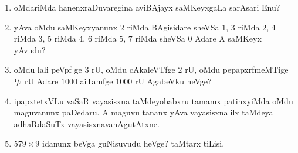 \begin{enumerate}
\item oMdariMda hanenxraDuvaregina aviBAjayx saMKeyxgaLa sarAsari Enu?

\item yAva oMdu saMKeyxyanunx $2$ riMda BAgisidare sheVSa $1$, $3$ riMda $2$, $4$ riMda $3$, $5$ riMda $4$, $6$ riMda $5$, $7$ riMda sheVSa $0$ Adare A saMKeyx yAvudu?

\item oMdu lali peVpf ge $3$ rU, oMdu cAkaleVTfge $2$ rU, oMdu pepapxrfmeMTige $\sfrac{1}{2}$ rU Adare $1000$ aiTamfge $1000$ rU AgabeVku heVge?

\item ipapxtetxVLu vaSaR vayasisxna taMdeyobabxru tamamx patinxyiMda oMdu maguvanunx paDedaru. A maguvu tananx yAva vayasisxnalilx taMdeya adhaRdaSuTx vayasisxnavanAgutAtxne.

\item $579\times 9$ idanunx beVga guNisuvudu heVge? taMtarx tiLisi.
\end{enumerate}
